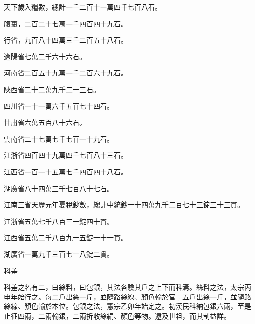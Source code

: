 \begin{pinyinscope}
 天下歲入糧數，總計一千二百十一萬四千七百八石。



 腹裏，二百二十七萬一千四百四十九石。



 行省，九百八十四萬三千二百五十八石。



 遼陽省七萬二千六十六石。



 河南省二百五十九萬一千二百六十九石。



 陜西省二十二萬九千二十三石。



 四川省一十一萬六千五百七十四石。



 甘肅省六萬五百八十六石。



 雲南省二十七萬七千七百一十九石。



 江浙省四百四十九萬四千七百八十三石。



 江西省一百一十五萬七千四百四十八石。



 湖廣省八十四萬三千七百八十七石。



 江南三省天歷元年夏稅鈔數，總計中統鈔一十四萬九千二百七十三錠三十三貫。



 江浙省五萬七千八百三十錠四十貫。



 江西省五萬二千八百九十五錠一十一貫。



 湖廣省一萬九千三百七十八錠二貫。



 科差



 科差之名有二，曰絲料，曰包銀，其法各驗其戶之上下而科焉。絲料之法，太宗丙申年始行之。每二戶出絲一斤，並隨路絲線、顏色輸於官；五戶出絲一斤，並隨路絲線、顏色輸於本位。包銀之法，憲宗乙卯年始定之。初漢民科納包銀六兩，至是止征四兩，二兩輸銀，二兩折收絲絹、顏色等物。逮及世祖，而其制益詳。




\end{pinyinscope}

